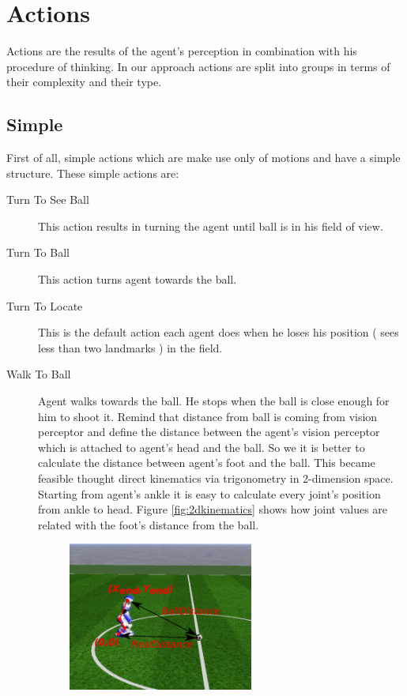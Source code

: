 \section{Actions}
Actions are the results of the agent's perception in combination with his procedure of thinking.
In our approach actions are split into groups in terms of their complexity and their type. 

\subsection{Simple}
First of all, simple actions which are make use only of motions and have a simple structure. These simple actions are:
\begin{description}
 \item[Turn To See Ball] This action results in turning the agent until ball is in his field of view.
 \item[Turn To Ball] This action turns agent towards the ball.
 \item[Turn To Locate] This is the default action each agent does when he loses his position ( sees less than two landmarks ) in the field.
 \item[Walk To Ball] Agent walks towards the ball. He stops when the ball is close enough for him to shoot it. Remind that distance from ball is coming from vision perceptor and define the distance between the agent's vision perceptor which is attached to agent's head and the ball. So we it is better to calculate the distance between agent's foot and the ball. This became feasible thought direct kinematics via trigonometry in 2-dimension space. Starting from agent's ankle it is easy to calculate every joint's position from ankle to head. Figure \ref{fig:2dkinematics} shows how joint values are related with the foot's distance from the ball.
 \begin{figure}[!h]
\centering
  \includegraphics[width=0.6\textwidth]{Chapter3/figures/2dkinematics.pdf}

\end{figure}
\end{description}
